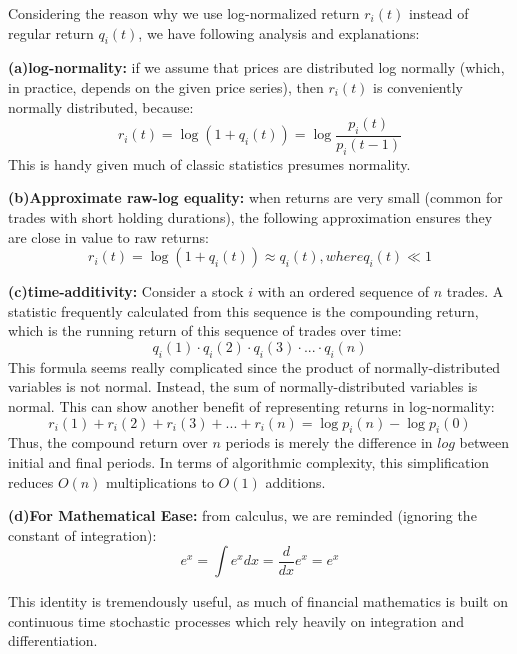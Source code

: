 \documentclass[11pt]{article}
\begin{document}
Considering the reason why we use log-normalized return $r_i(t)$ instead of regular return $q_i(t)$, we have following analysis and explanations:

\textbf{(a)log-normality:} if we assume that prices are distributed log normally (which, in practice, depends on the given price series), then $r_i(t)$ is conveniently normally distributed, because:
\begin{displaymath}r_i(t) = \log(1 + q_i(t)) = \log\frac{p_i(t)}{p_i(t-1)}\end{displaymath}
This is handy given much of classic statistics presumes normality.

\textbf{(b)Approximate raw-log equality:} when returns are very small (common for trades with short holding durations), the following approximation ensures they are close in value to raw returns:
\begin{displaymath}r_i(t) = \log(1 + q_i(t)) \approx q_i(t), where q_i(t)\ll 1\end{displaymath}

\textbf{(c)time-additivity:} Consider a stock $i$ with an ordered sequence of $n$ trades. A statistic frequently calculated from this sequence is the compounding return, which is the running return of this sequence of trades over time:
\begin{displaymath}q_i(1) \cdot q_i(2) \cdot q_i(3) \cdot...\cdot q_i(n)\end{displaymath}
This formula seems really complicated since the product of normally-distributed variables is not normal. Instead, the sum of normally-distributed variables is normal. This can show another benefit of representing returns in log-normality:
\begin{displaymath}r_i(1) + r_i(2) + r_i(3) + ... + r_i(n) =\log p_i(n) - \log p_i(0)\end{displaymath}
Thus, the compound return over $n$ periods is merely the difference in $log$ between initial and final periods. In terms of algorithmic complexity, this simplification reduces $O(n)$ multiplications to $O(1)$ additions. 

\textbf{(d)For Mathematical Ease:}
from calculus, we are reminded (ignoring the constant of integration):
\begin{displaymath}e^x = \int e^xdx = \frac{d}{dx} e^x = e^x\end{displaymath}

This identity is tremendously useful, as much of financial mathematics is built on continuous time stochastic processes which rely heavily on integration and differentiation.
\end{document}

